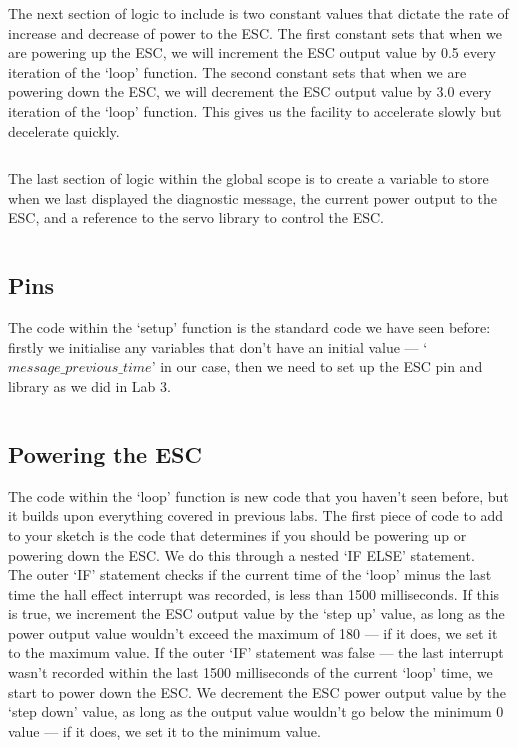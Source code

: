 \documentclass[11pt,a4paper]{article}
\begin{document}
\noindent
The next section of logic to include is two constant values that dictate the rate of increase and decrease of power to the ESC. The first constant sets that when we are powering up the ESC, we will increment the ESC output value by 0.5 every iteration of the `loop' function. The second constant sets that when we are powering down the ESC, we will decrement the ESC output value by 3.0 every iteration of the `loop' function. This gives us the facility to accelerate slowly but decelerate quickly.\\
\vspace{-1.75em}
\inputminted{arduino}{./src/2-esc-constants.txt}
\vspace{.75em}

\noindent
The last section of logic within the global scope is to create a variable to store when we last displayed the diagnostic message, the current power output to the ESC, and a reference to the servo library to control the ESC.\\
\vspace{-1.75em}
\inputminted{arduino}{./src/3-system-variables.txt}
\vspace{0em}

\subsection{Pins}
The code within the `setup' function is the standard code we have seen before: firstly we initialise any variables that don't have an initial value --- `$message\_previous\_time$' in our case, then we need to set up the ESC pin and library as we did in Lab 3.\\
\vspace{-1.75em}
\inputminted{arduino}{./src/4-servo.txt}
\vspace{0em}

\subsection{Powering the ESC}
The code within the `loop' function is new code that you haven't seen before, but it builds upon everything covered in previous labs. The first piece of code to add to your sketch is the code that determines if you should be powering up or powering down the ESC. We do this through a nested `IF ELSE' statement. \\

\noindent
The outer `IF' statement checks if the current time of the `loop' minus the last time the hall effect interrupt was recorded, is less than 1500 milliseconds. If this is true, we increment the ESC output value by the `step up' value, as long as the power output value wouldn't exceed the maximum of 180 --- if it does, we set it to the maximum value. If the outer `IF' statement was false --- the last interrupt wasn't recorded within the last 1500 milliseconds of the current `loop' time, we start to power down the ESC. We decrement the ESC power output value by the `step down' value, as long as the output value wouldn't go below the minimum 0 value --- if it does, we set it to the minimum value.\\
\end{document}
